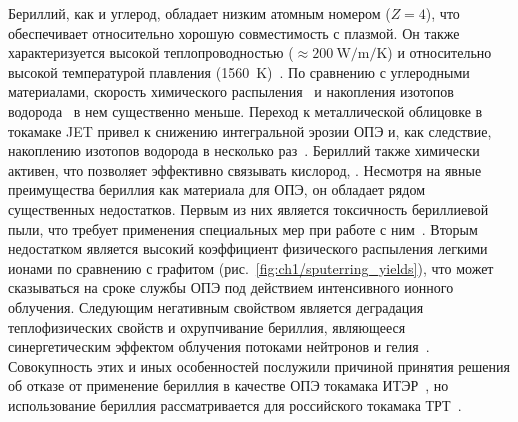 Бериллий, как и углерод, обладает низким атомным номером ($Z=4$), что обеспечивает относительно хорошую совместимость с плазмой. Он также характеризуется высокой теплопроводностью (\( \approx \SI{200}{\watt\per\meter\per\K} \)) и относительно высокой температурой плавления (\SI{1560}{\kelvin})~\cite{Ho1974}. По сравнению с углеродными материалами, скорость химического распыления~\cite{Brezinsek2014} и накопления изотопов водорода~\cite{DeTemmerman2021} в нем существенно меньше. Переход к металлической облицовке в токамаке JET привел к снижению интегральной эрозии ОПЭ и, как следствие, накоплению изотопов водорода в несколько раз~\cite{Brezinsek2015}. Бериллий также химически активен, что позволяет эффективно связывать кислород, . Несмотря на явные преимущества бериллия как материала для ОПЭ, он обладает рядом существенных недостатков. Первым из них является токсичность бериллиевой пыли, что требует применения специальных мер при работе с ним~\cite{Strupp2011}. Вторым недостатком является высокий коэффициент физического распыления легкими ионами по сравнению с графитом (рис.~\cref{fig:ch1/sputerring_yields}), что может сказываться на сроке службы ОПЭ под действием интенсивного ионного облучения. Следующим негативным свойством является деградация теплофизических свойств и охрупчивание бериллия, являющееся синергетическим эффектом облучения потоками нейтронов и гелия~\cite{Kesternich2003,Gilbert2012}. Совокупность этих и иных особенностей послужили причиной принятия решения об отказе от применение бериллия в качестве ОПЭ токамака ИТЭР~\cite{Barabaschi2025}, но использование бериллия  рассматривается для российского токамака ТРТ~\cite{Mazul2021,Piskarev2024}.

